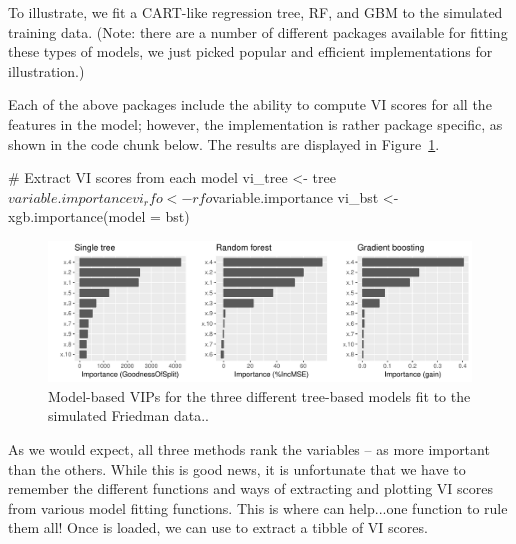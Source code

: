 To illustrate, we fit a CART-like regression tree, RF, and GBM to the simulated training data. (Note: there are a number of different packages available for fitting these types of models, we just picked popular and efficient implementations for illustration.)


Each of the above packages include the ability to compute VI scores for all the features in the model; however, the implementation is rather package specific, as shown in the code chunk below. The results are displayed in Figure~\ref{fig:vi-plots}.

\begin{example}
# Extract VI scores from each model
vi_tree <- tree$variable.importance
vi_rfo <- rfo$variable.importance
vi_bst <- xgb.importance(model = bst)
\end{example}

\begin{figure}[!htb]
  \centering 
  \includegraphics[width=1\linewidth]{figures/vi-plots} 
  \caption{Model-based VIPs for the three different tree-based models fit to the simulated Friedman data..}
  \label{fig:vi-plots}
\end{figure}

As we would expect, all three methods rank the variables -- as more important than the others. While this is good news, it is unfortunate that we have to remember the different functions and ways of extracting and plotting VI scores from various model fitting functions. This is where  \citep{vip-pkg} can help...one function to rule them all! Once  is loaded, we can use  to extract a tibble of VI scores.

